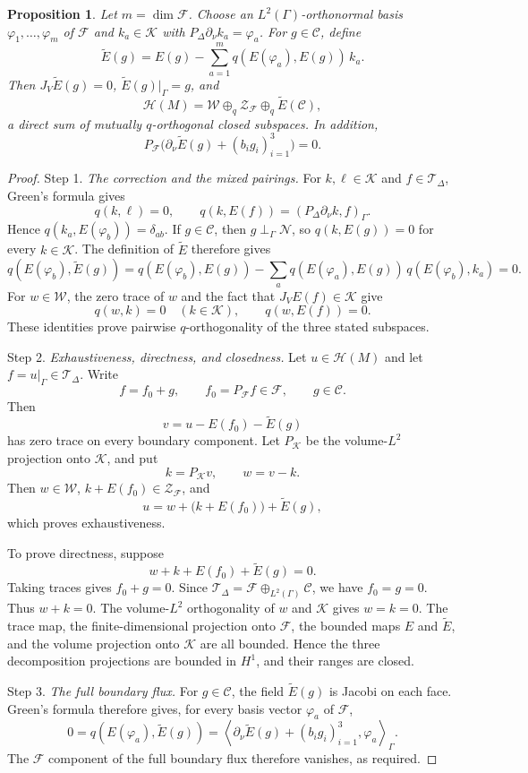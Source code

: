 \documentclass[11pt,twoside]{amsart}
\newtheorem{prop}[thm]{Proposition}
\numberwithin{equation}{section}
\begin{document}
\begin{prop} \label{prop: decomp Kperp Z}
Let $m=\dim\mathcal F$. Choose an $L^2(\Gamma)$-orthonormal basis $\varphi_1,\ldots,\varphi_m$ of $\mathcal F$ and $k_a\in\mathcal K$ with $P_\Delta\partial_\nu k_a=\varphi_a$. For $g\in\mathcal C$, define
\[
\widetilde E(g)=E(g)-\sum_{a=1}^m q(E(\varphi_a),E(g))\,k_a.
\]
Then $J_V\widetilde E(g)=0$, $\widetilde E(g)|_\Gamma=g$, and
\[
\mathcal H(M)=\mathcal W\oplus_q\mathcal Z_{\mathcal F}\oplus_q\widetilde E(\mathcal C),
\]
a direct sum of mutually $q$-orthogonal closed subspaces. In addition,
\[
P_{\mathcal F}\bigl(\partial_\nu\widetilde E(g)+(b_i g_i)_{i=1}^3\bigr)=0.
\]
\end{prop}
\begin{proof}
\noindent Step 1. \emph{The correction and the mixed pairings.}
For $k,\ell\in\mathcal K$ and $f\in\mathcal T_\Delta$, Green's formula gives
\[
q(k,\ell)=0,
\qquad
q(k,E(f))=(P_\Delta\partial_\nu k,f)_\Gamma.
\]
Hence $q(k_a,E(\varphi_b))=\delta_{ab}$. If $g\in\mathcal C$, then $g\perp_\Gamma\mathcal N$, so $q(k,E(g))=0$ for every $k\in\mathcal K$. The definition of $\widetilde E$ therefore gives
\[
q(E(\varphi_b),\widetilde E(g))
=q(E(\varphi_b),E(g))
-\sum_a q(E(\varphi_a),E(g))\,q(E(\varphi_b),k_a)=0.
\]
For $w\in\mathcal W$, the zero trace of $w$ and the fact that $J_VE(f)\in\mathcal K$ give
\[
q(w,k)=0\quad(k\in\mathcal K),
\qquad
q(w,E(f))=0.
\]
These identities prove pairwise $q$-orthogonality of the three stated subspaces.

\medskip
\noindent Step 2. \emph{Exhaustiveness, directness, and closedness.}
Let $u\in\mathcal H(M)$ and let $f=u|_\Gamma\in\mathcal T_\Delta$. Write
\[
f=f_0+g,
\qquad f_0=P_\mathcal Ff\in\mathcal F,
\qquad g\in\mathcal C.
\]
Then
\[
v=u-E(f_0)-\widetilde E(g)
\]
has zero trace on every boundary component. Let $P_\mathcal K$ be the volume-$L^2$ projection onto $\mathcal K$, and put
\[
k=P_\mathcal K v,
\qquad w=v-k.
\]
Then $w\in\mathcal W$, $k+E(f_0)\in\mathcal Z_\mathcal F$, and
\[
u=w+\bigl(k+E(f_0)\bigr)+\widetilde E(g),
\]
which proves exhaustiveness.

To prove directness, suppose
\[
w+k+E(f_0)+\widetilde E(g)=0.
\]
Taking traces gives $f_0+g=0$. Since $\mathcal T_\Delta=\mathcal F\oplus_{L^2(\Gamma)}\mathcal C$, we have $f_0=g=0$. Thus $w+k=0$. The volume-$L^2$ orthogonality of $w$ and $\mathcal K$ gives $w=k=0$. The trace map, the finite-dimensional projection onto $\mathcal F$, the bounded maps $E$ and $\widetilde E$, and the volume projection onto $\mathcal K$ are all bounded. Hence the three decomposition projections are bounded in $H^1$, and their ranges are closed.

\medskip
\noindent Step 3. \emph{The full boundary flux.}
For $g\in\mathcal C$, the field $\widetilde E(g)$ is Jacobi on each face. Green's formula therefore gives, for every basis vector $\varphi_a$ of $\mathcal F$,
\[
0=q(E(\varphi_a),\widetilde E(g))
=\left\langle
\partial_\nu\widetilde E(g)+(b_i g_i)_{i=1}^3,\varphi_a
\right\rangle_\Gamma.
\]
The $\mathcal F$ component of the full boundary flux therefore vanishes, as required.
\end{proof}
\end{document}
